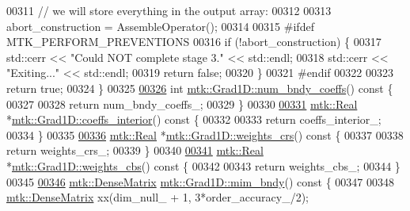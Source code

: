 \begin{DoxyCode}
{{00311   \textcolor{comment}{// we will store everything in the output array:}
00312 
00313   abort\_construction = AssembleOperator();
00314 
00315 \textcolor{preprocessor}{  #ifdef MTK\_PERFORM\_PREVENTIONS}
00316   \textcolor{keywordflow}{if} (!abort\_construction) \{
00317     std::cerr << \textcolor{stringliteral}{"Could NOT complete stage 3."} << std::endl;
00318     std::cerr << \textcolor{stringliteral}{"Exiting..."} << std::endl;
00319     \textcolor{keywordflow}{return} \textcolor{keyword}{false};
00320   \}
00321 \textcolor{preprocessor}{  #endif}
00322 
00323   \textcolor{keywordflow}{return} \textcolor{keyword}{true};
00324 \}
00325 
\hypertarget{mtk__grad__1d_8cc_source_l00326}{}\hyperlink{classmtk_1_1Grad1D_a7168205c21ba00012558f8bba069c119}{00326} \textcolor{keywordtype}{int} \hyperlink{classmtk_1_1Grad1D_a7168205c21ba00012558f8bba069c119}{mtk::Grad1D::num\_bndy\_coeffs}()\textcolor{keyword}{ const }\{
00327 
00328   \textcolor{keywordflow}{return} num\_bndy\_coeffs\_;
00329 \}
00330 
\hypertarget{mtk__grad__1d_8cc_source_l00331}{}\hyperlink{classmtk_1_1Grad1D_a88735f8d2a6ed986370dc3caeb84959b}{00331} \hyperlink{group__c01-roots_gac080bbbf5cbb5502c9f00405f894857d}{mtk::Real} *\hyperlink{classmtk_1_1Grad1D_a88735f8d2a6ed986370dc3caeb84959b}{mtk::Grad1D::coeffs\_interior}()\textcolor{keyword}{ const }\{
00332 
00333   \textcolor{keywordflow}{return} coeffs\_interior\_;
00334 \}
00335 
\hypertarget{mtk__grad__1d_8cc_source_l00336}{}\hyperlink{classmtk_1_1Grad1D_ae5f15d8986a5680b6a1c120283c6cc5e}{00336} \hyperlink{group__c01-roots_gac080bbbf5cbb5502c9f00405f894857d}{mtk::Real} *\hyperlink{classmtk_1_1Grad1D_ae5f15d8986a5680b6a1c120283c6cc5e}{mtk::Grad1D::weights\_crs}()\textcolor{keyword}{ const }\{
00337 
00338   \textcolor{keywordflow}{return} weights\_crs\_;
00339 \}
00340 
\hypertarget{mtk__grad__1d_8cc_source_l00341}{}\hyperlink{classmtk_1_1Grad1D_ad11927d8f9f1ca0089aaa2be7094f7f3}{00341} \hyperlink{group__c01-roots_gac080bbbf5cbb5502c9f00405f894857d}{mtk::Real} *\hyperlink{classmtk_1_1Grad1D_ad11927d8f9f1ca0089aaa2be7094f7f3}{mtk::Grad1D::weights\_cbs}()\textcolor{keyword}{ const }\{
00342 
00343   \textcolor{keywordflow}{return} weights\_cbs\_;
00344 \}
00345 
\hypertarget{mtk__grad__1d_8cc_source_l00346}{}\hyperlink{classmtk_1_1Grad1D_ab25e1d064a5a00fbe3777e65fd5750c0}{00346} \hyperlink{classmtk_1_1DenseMatrix}{mtk::DenseMatrix} \hyperlink{classmtk_1_1Grad1D_ab25e1d064a5a00fbe3777e65fd5750c0}{mtk::Grad1D::mim\_bndy}()\textcolor{keyword}{ const }\{
00347 
00348   \hyperlink{classmtk_1_1DenseMatrix}{mtk::DenseMatrix} xx(dim\_null\_ + 1, 3*order\_accuracy\_/2);
}}
\end{DoxyCode}
